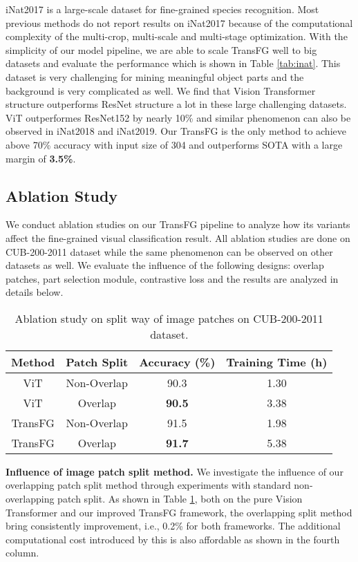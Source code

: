 \documentclass[10pt,twocolumn,letterpaper]{article}
\begin{document}
iNat2017 is a large-scale dataset for fine-grained species recognition. Most previous methods do not report results on iNat2017 because of the computational complexity of the multi-crop, multi-scale and multi-stage optimization. With the simplicity of our model pipeline, we are able to scale TransFG well to big datasets and evaluate the performance which is shown in Table \ref{tab:inat}. This dataset is very challenging for mining meaningful object parts and the background is very complicated as well. We find that Vision Transformer structure outperforms ResNet structure a lot in these large challenging datasets. ViT outperformes ResNet152 by nearly 10\% and similar phenomenon can also be observed in iNat2018 and iNat2019. Our TransFG is the only method to achieve above 70\% accuracy with input size of 304 and outperforms SOTA with a large margin of \textbf{3.5\%}.

\subsection{Ablation Study}
\label{sec:ablation}

We conduct ablation studies on our TransFG pipeline to analyze how its variants affect the fine-grained visual classification result. All ablation studies are done on CUB-200-2011 dataset while the same phenomenon can be observed on other datasets as well. We evaluate the influence of the following designs: overlap patches, part selection module, contrastive loss and the results are analyzed in details below.

\begin{table}[]
    \small
    \centering
    \caption{Ablation study on split way of image patches on CUB-200-2011 dataset.}
    \label{tab:absplit}
    \begin{tabular}{|c|c|c|c|}
    \hline
    Method & Patch Split & Accuracy (\%) & Training Time (h)\\ \hline
    ViT & Non-Overlap & 90.3 & 1.30 \\ 
    ViT & Overlap & \textbf{90.5} & 3.38  \\ \hline
    TransFG & Non-Overlap & 91.5 & 1.98 \\
    TransFG & Overlap & \textbf{91.7} & 5.38 \\ \hline
    \end{tabular}
\end{table}

\textbf{Influence of image patch split method.} We investigate the influence of our overlapping patch split method through experiments with standard non-overlapping patch split. As shown in Table \ref{tab:absplit}, both on the pure Vision Transformer and our improved TransFG framework, the overlapping split method bring consistently improvement, i.e., 0.2\% for both frameworks. The additional computational cost introduced by this is also affordable as shown in the fourth column. 
\end{document}
